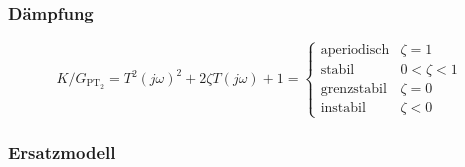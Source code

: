 \begin{landscape}
\begin{multicols}{2}
		\subsubsection{D\"ampfung}
		\[
			K/G_{\text{PT}_2} = T^2 (j\omega)^2 + 2 \zeta T (j\omega) + 1
			= \begin{cases}
				\text{aperiodisch} & \zeta = 1     \\
				\text{stabil}      & 0 < \zeta < 1 \\
				\text{grenzstabil} & \zeta = 0     \\
				\text{instabil}    & \zeta < 0 
			\end{cases}
		\]
		\subsubsection{Ersatzmodell}
	\end{multicols}
\end{landscape}
\restoregeometry

